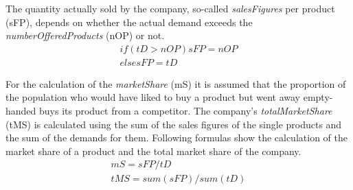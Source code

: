 The quantity actually sold by the company, so-called \textit{salesFigures} per product (\gls{sFP}), depends on whether the actual demand exceeds the \textit{numberOfferedProducts} (\gls{nOP}) or not.
\begin{equation}
\label{func:salesFigure}
\begin{aligned}
if ( tD > nOP ) { sFP = nOP } \\
else { sFP = tD }    
\end{aligned}
\end{equation}

For the calculation of the \textit{marketShare} (\gls{mS}) it is assumed that the proportion of the population who would have liked to buy a product but went away empty-handed buys its product from a competitor. The company's \textit{totalMarketShare} (\gls{tMS}) is calculated using the sum of the sales figures of the single products and the sum of the demands for them. Following formulas show the calculation of the market share of a product and the total market share of the company.  
\begin{equation}
\label{func:marketShare}
\begin{aligned}
mS = sFP / tD \\
tMS = sum(sFP) / sum(tD)   
\end{aligned}
\end{equation}

